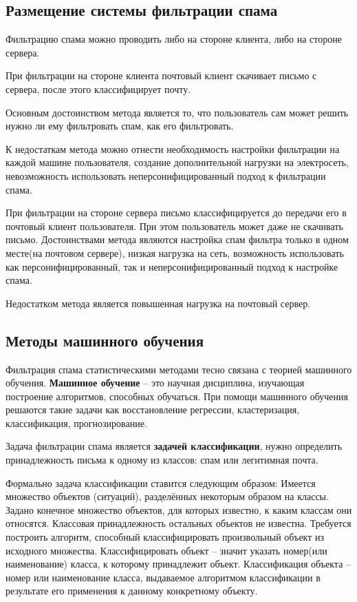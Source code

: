 \subsection{Размещение системы фильтрации  спама}
Фильтрацию спама можно проводить либо на стороне клиента, либо на стороне сервера. 

При фильтрации на стороне клиента почтовый клиент скачивает письмо с сервера, после этого классифицирует почту. 

Основным достоинством метода является то, что пользователь сам может решить нужно ли ему фильтровать спам, как его фильтровать.

К недостаткам метода можно отнести необходимость настройки фильтрации на каждой машине пользователя, создание  дополнительной нагрузки на электросеть, невозможность использовать неперсонифицированный подход к фильтрации спама.


При фильтрации на стороне сервера письмо классифицируется до передачи его в почтовый клиент пользователя. При этом пользователь может даже не скачивать письмо. Достоинствами метода являются настройка спам фильтра только в одном месте(на почтовом сервере), низкая нагрузка на сеть, возможность использовать как персонифицированный, так и неперсонифицированный подход к настройке спама.

Недостатком метода является повышенная нагрузка на почтовый сервер. 


\subsection{Методы машинного обучения}
Фильтрация спама статистическими методами тесно связана с теорией машинного обучения.
\textbf{Машинное обучение} – это научная дисциплина, изучающая построение алгоритмов, способных обучаться. При помощи машинного обучения решаются такие задачи как восстановление регрессии, кластеризация, классификация, прогнозирование.

Задача фильтрации спама является \textbf{задачей классификации}, нужно определить принадлежность письма к одному из классов: спам или легитимная почта.

Формально задача классификации ставится следующим образом: Имеется множество объектов (ситуаций), разделённых некоторым образом на классы. Задано конечное множество объектов, для которых известно, к каким классам они относятся. Классовая принадлежность остальных объектов не известна. Требуется построить алгоритм, способный классифицировать произвольный объект из исходного множества. Классифицировать объект – значит указать номер(или наименование) класса, к которому принадлежит объект. Классификация объекта – номер или  наименование класса, выдаваемое алгоритмом классификации в результате его применения к данному конкретному объекту.

